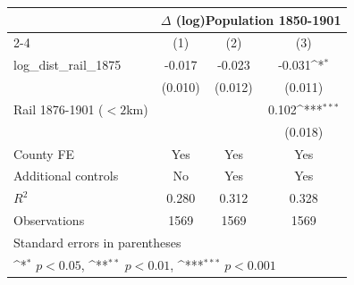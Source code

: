 {
\def\sym#1{\ifmmode^{#1}\else\(^{#1}\)\fi}
\begin{tabular}{l*{3}{c}}
\toprule
                &\multicolumn{3}{c}{$\Delta$ (log)Population 1850-1901}  \\\cmidrule(lr){2-4}
                &\multicolumn{1}{c}{(1)}         &\multicolumn{1}{c}{(2)}         &\multicolumn{1}{c}{(3)}         \\
\midrule
log\_dist\_rail\_1875&   -0.017         &   -0.023         &   -0.031\sym{*}  \\
                &  (0.010)         &  (0.012)         &  (0.011)         \\
Rail 1876-1901 ($<2$km)&                  &                  &    0.102\sym{***}\\
                &                  &                  &  (0.018)         \\
County FE       &      Yes         &      Yes         &      Yes         \\
Additional controls &       No         &      Yes         &      Yes         \\
\midrule
\(R^{2}\)       &    0.280         &    0.312         &    0.328         \\
Observations    &     1569         &     1569         &     1569         \\
\bottomrule
\multicolumn{4}{l}{\footnotesize Standard errors in parentheses}\\
\multicolumn{4}{l}{\footnotesize \sym{*} \(p<0.05\), \sym{**} \(p<0.01\), \sym{***} \(p<0.001\)}\\
\end{tabular}
}
